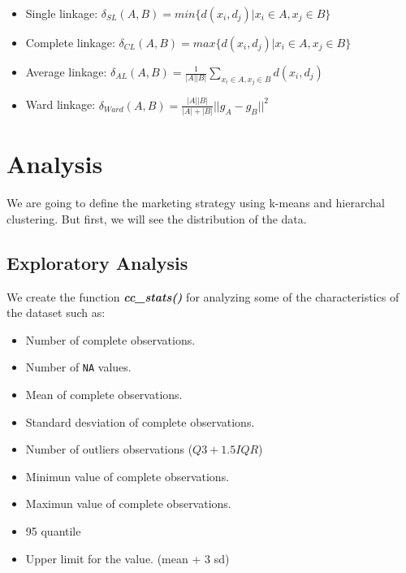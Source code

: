 \documentclass[11pt,]{article}
\begin{document}
\begin{itemize}
\item
  Single linkage:
  \(\delta_{SL}(A, B) = min\{d(x_{i}, d_{j})| x_{i} \in A, x_{j} \in B \}\)
\item
  Complete linkage:
  \(\delta_{CL}(A, B) = max\{d(x_{i}, d_{j})| x_{i} \in A, x_{j} \in B \}\)
\item
  Average linkage:
  \(\delta_{AL}(A, B) = \frac{1}{|A||B|} \sum_{x_{i} \in A, x_{j} \in B } d(x_{i}, d_{j})\)
\item
  Ward linkage:
  \(\delta_{Ward}(A, B) = \frac{|A||B|}{|A| + |B|} {|| g_{A} - g_{B} ||}^{2}\)
\end{itemize}

\section{Analysis}\label{analysis}

We are going to define the marketing strategy using k-means and
hierarchal clustering. But first, we will see the distribution of the
data.

\subsection{\texorpdfstring{\textbf{Exploratory
Analysis}}{Exploratory Analysis}}\label{exploratory-analysis}

We create the function \emph{\textbf{cc\_stats()}} for analyzing some of
the characteristics of the dataset such as:

\begin{itemize}
\item
  Number of complete observations.
\item
  Number of \texttt{NA} values.
\item
  Mean of complete observations.
\item
  Standard desviation of complete observations.
\item
  Number of outliers observations (\(Q3 + 1.5IQR\))
\item
  Minimun value of complete observations.
\item
  Maximun value of complete observations.
\item
  95 quantile
\item
  Upper limit for the value. (mean + 3 sd)
\end{itemize}
\end{document}
